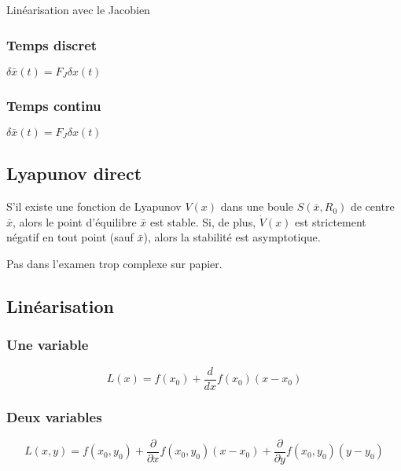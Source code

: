 \documentclass[resume]{subfiles}
\begin{document}
 Linéarisation avec le Jacobien

\subsubsection{Temps discret}

$\delta \bar{x}(t) = F_J \delta x(t)$ 

\subsubsection{Temps continu}

$\delta\bar{x}(t) = F_J\delta x(t)$ 

\subsection{Lyapunov direct}

S'il existe une fonction de Lyapunov $V(x)$ dans une boule $S(\bar{x},R_0)$ de centre $\bar{x}$, alors le point d'équilibre $\bar{x}$ est stable. Si, de plus, $\dot{V}(x)$ est strictement négatif en tout point (sauf $\bar{x}$), alors la stabilité est asymptotique.  

Pas dans l'examen trop complexe sur papier.

\subsection{Linéarisation}
\subsubsection{Une variable}
$$\boxed{L(x)=f(x_0)+\frac{d}{dx}f(x_0)(x-x_0)}$$
\subsubsection{Deux variables}
$$\boxed{L(x,y)=f(x_0,y_0)+\frac{\partial}{\partial x}f(x_0,y_0)(x-x_0) + \frac{\partial}{\partial y}f(x_0,y_0)(y-y_0)}$$
\end{document}
